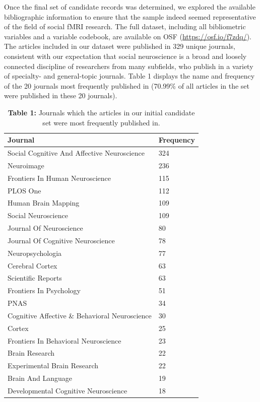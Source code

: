 \documentclass[
  man,floatsintext]{apa6}
\begin{document}
Once the final set of candidate records was determined, we explored the available bibliographic information to ensure that the sample indeed seemed representative of the field of social fMRI research. The full dataset, including all bibliometric variables and a variable codebook, are available on OSF (\url{https://osf.io/f7zdq/}). The articles included in our dataset were published in 329 unique journals, consistent with our expectation that social neuroscience is a broad and loosely connected discipline of researchers from many subfields, who publish in a variety of specialty- and general-topic journals. Table 1 displays the name and frequency of the 20 journals most frequently published in (70.99\% of all articles in the set were published in these 20 journals).

\begin{table}[tbp]

\begin{center}
\begin{threeparttable}

\caption{\label{tab:tab1}\textbf{Table 1:} Journals which the articles in our initial candidate set were most frequently published in.}

\begin{tabular}{ll}
\toprule
Journal & \multicolumn{1}{c}{Frequency}\\
\midrule
Social Cognitive And Affective Neuroscience & 324\\
Neuroimage & 236\\
Frontiers In Human Neuroscience & 115\\
PLOS One & 112\\
Human Brain Mapping & 109\\
Social Neuroscience & 109\\
Journal Of Neuroscience & 80\\
Journal Of Cognitive Neuroscience & 78\\
Neuropsychologia & 77\\
Cerebral Cortex & 63\\
Scientific Reports & 63\\
Frontiers In Psychology & 51\\
PNAS & 34\\
Cognitive Affective \& Behavioral Neuroscience & 30\\
Cortex & 25\\
Frontiers In Behavioral Neuroscience & 23\\
Brain Research & 22\\
Experimental Brain Research & 22\\
Brain And Language & 19\\
Developmental Cognitive Neuroscience & 18\\
\bottomrule
\end{tabular}

\end{threeparttable}
\end{center}

\end{table}
\end{document}

